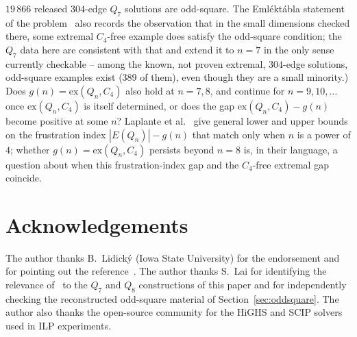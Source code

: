 \documentclass[12pt,a4paper]{article}
\theoremstyle{definition}
\newcommand{\ex}{\mathrm{ex}}
\begin{document}
\begin{enumerate}
    $19\,866$ released $304$-edge $Q_7$ solutions are odd-square.
    The Emléktábla statement of the problem~\cite{Emlek26} also records
    the observation that in the small dimensions checked there, some
    extremal $C_4$-free example does satisfy the odd-square condition;
    the $Q_7$ data here are consistent with that and extend it to $n=7$
    in the only sense currently checkable -- among the known, not proven
    extremal, $304$-edge solutions, odd-square examples exist ($389$ of
    them), even though they are a small minority.) Does
    $g(n)=\ex(Q_n,C_4)$ also hold at $n=7,8$, and continue for
    $n=9,10,\ldots$ once
    $\ex(Q_n,C_4)$ is itself determined, or does the gap
    $\ex(Q_n,C_4)-g(n)$ become positive at some $n$? Laplante et
    al.~\cite{LNSW26} give general lower and upper bounds on the
    frustration index $|E(Q_n)|-g(n)$ that match only when $n$ is a
    power of $4$; whether $g(n)=\ex(Q_n,C_4)$ persists beyond $n=8$ is,
    in their language, a question about when this frustration-index
    gap and the $C_4$-free extremal gap coincide.
\end{enumerate}

\section*{Acknowledgements}
The author thanks B.~Lidick\'y (Iowa State University) for the endorsement
and for pointing out the reference~\cite{Bab12}.
The author thanks S.~Lai for identifying the relevance
of~\cite{DPTV79,MPR95} to the $Q_7$ and $Q_8$ constructions of this paper
and for independently checking the reconstructed odd-square material of
Section~\ref{sec:oddsquare}.
The author also thanks the open-source community for the HiGHS and SCIP
solvers used in ILP experiments.
\end{document}
